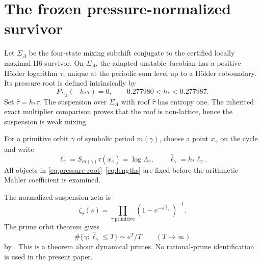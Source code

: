 \section{The frozen pressure-normalized survivor}

Let \(\Sigma_A\) be the four-state mixing subshift conjugate to the certified
locally maximal H6 survivor.  On \(\Sigma_A\), the adapted unstable Jacobian
has a positive H\"older logarithm \(\tau\), unique at the periodic-sum level
up to a H\"older coboundary.  Its pressure root is defined intrinsically by
\begin{equation}
P_{\Sigma_A}(-h_*\tau)=0,
\qquad
0.277980<h_*<0.277987.
\label{eq:pressure-root}
\end{equation}
Set \(\widehat\tau=h_*\tau\).  The suspension over \(\Sigma_A\) with roof
\(\widehat\tau\) has entropy one.  The inherited exact multiplier comparison
proves that the roof is non-lattice, hence the suspension is weak mixing.

For a primitive orbit \(\gamma\) of symbolic period \(m(\gamma)\), choose a
point \(x_\gamma\) on the cycle and write
\begin{equation}
\ell_\gamma=S_{m(\gamma)}\tau(x_\gamma)
=\log\Lambda_\gamma,
\qquad
\widehat\ell_\gamma=h_*\ell_\gamma.
\label{eq:lengths}
\end{equation}
All objects in \eqref{eq:pressure-root}--\eqref{eq:lengths} are fixed before
the arithmetic Mahler coefficient is examined.

The normalized suspension zeta is
\begin{equation}
\zeta_{\widehat\tau}(s)
=\prod_{\gamma\ \mathrm{primitive}}
\left(1-e^{-s\widehat\ell_\gamma}\right)^{-1}.
\label{eq:zeta}
\end{equation}
The prime orbit theorem gives
\begin{equation}
\#\{\gamma:\widehat\ell_\gamma\le T\}\sim e^T/T
\qquad(T\to\infty)
\label{eq:pot}
\end{equation}
by \citet[Theorem~6.9]{ParryPollicott1990}.  This is a theorem about
dynamical primes.  No rational-prime identification is used in the present
paper.
